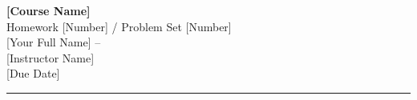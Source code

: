 
\begin{center}
    {\Large\bfseries [Course Name]}\\[0.3cm]
    {\normalsize Homework [Number] / Problem Set [Number]}\\[0.5cm]
    {\normalsize [Your Full Name] \quad -- }\\[0.2cm]
    {\normalsize [Instructor Name]} \\[0.2cm]
    {\normalsize [Due Date]}
\end{center}

\vspace{1cm}
\hrule
\vspace{1cm}